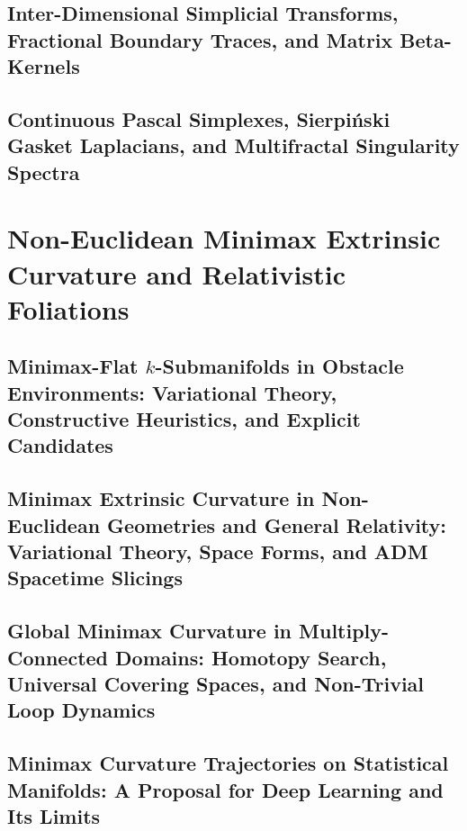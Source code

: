 \documentclass[11pt,a4paper,openright,twoside]{book}
\begin{document}
\chapter{Inter-Dimensional Simplicial Transforms, Fractional Boundary Traces, and Matrix Beta-Kernels}


\chapter{Continuous Pascal Simplexes, Sierpi\'nski Gasket Laplacians, and Multifractal Singularity Spectra}


\part{Non-Euclidean Minimax Extrinsic Curvature and Relativistic Foliations}

\chapter{Minimax-Flat \texorpdfstring{$k$}{k}-Submanifolds in Obstacle Environments: Variational Theory, Constructive Heuristics, and Explicit Candidates}


\chapter{Minimax Extrinsic Curvature in Non-Euclidean Geometries and General Relativity: Variational Theory, Space Forms, and ADM Spacetime Slicings}


\chapter{Global Minimax Curvature in Multiply-Connected Domains: Homotopy Search, Universal Covering Spaces, and Non-Trivial Loop Dynamics}


\chapter{Minimax Curvature Trajectories on Statistical Manifolds: A Proposal for Deep Learning and Its Limits}

\end{document}

